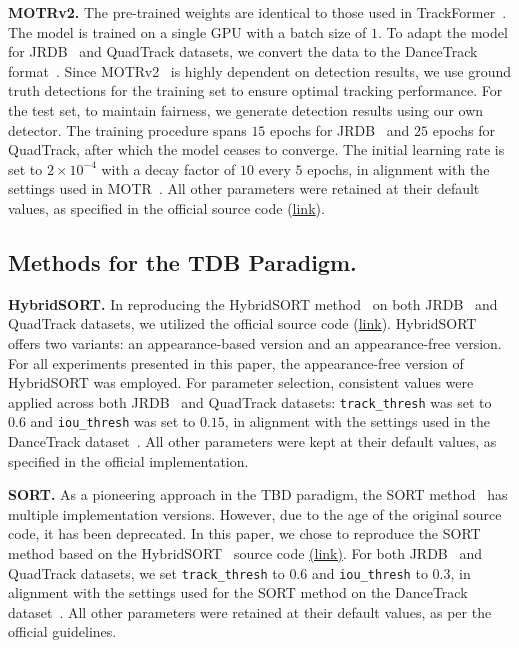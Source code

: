 \noindent\textbf{MOTRv2.} 
The pre-trained weights are identical to those used in TrackFormer~\cite{meinhardt2021trackformer}. 
The model is trained on a single GPU with a batch size of $1$.
To adapt the model for JRDB~\cite{martin2021jrdb} and QuadTrack datasets, we convert the data to the DanceTrack format~\cite{peize2021dance}. 
Since MOTRv2~\cite{zhang2023motrv2} is highly dependent on detection results, we use ground truth detections for the training set to ensure optimal tracking performance. 
For the test set, to maintain fairness, we generate detection results using our own detector.
The training procedure spans $15$ epochs for JRDB~\cite{martin2021jrdb} and $25$ epochs for QuadTrack, after which the model ceases to converge. The initial learning rate is set to \( 2 {\times} 10^{-4} \) with a decay factor of $10$ every $5$ epochs, in alignment with the settings used in MOTR~\cite{zeng2022motr}.
All other parameters were retained at their default values, as specified in the official source code (\href{https://github.com/megvii-research/MOTRv2}{link}). 

\subsection{Methods for the TDB Paradigm.}

\noindent\textbf{HybridSORT.} 
In reproducing the HybridSORT method~\cite{yang2024hybrid} on both JRDB~\cite{martin2021jrdb} and QuadTrack datasets, we utilized the official source code (\href{https://github.com/ymzis69/HybridSORT}{link}). HybridSORT offers two variants: an appearance-based version and an appearance-free version. 
For all experiments presented in this paper, the appearance-free version of HybridSORT was employed. For parameter selection, consistent values were applied across both JRDB~\cite{martin2021jrdb} and QuadTrack datasets: \texttt{track\_thresh} was set to $0.6$ and \texttt{iou\_thresh} was set to $0.15$, in alignment with the settings used in the DanceTrack dataset~\cite{peize2021dance}. 
All other parameters were kept at their default values, as specified in the official implementation.

\noindent\textbf{SORT.} As a pioneering approach in the TBD paradigm, the SORT method~\cite{bewley2016simple} has multiple implementation versions. However, due to the age of the original source code, it has been deprecated. In this paper, we chose to reproduce the SORT method based on the HybridSORT~\cite{yang2024hybrid} source code \href{https://github.com/ymzis69/HybridSORT}{(link)}. 
For both JRDB~\cite{martin2021jrdb} and QuadTrack datasets, we set \texttt{track\_thresh} to $0.6$ and \texttt{iou\_thresh} to $0.3$, in alignment with the settings used for the SORT method on the DanceTrack dataset~\cite{peize2021dance}. 
All other parameters were retained at their default values, as per the official guidelines.

